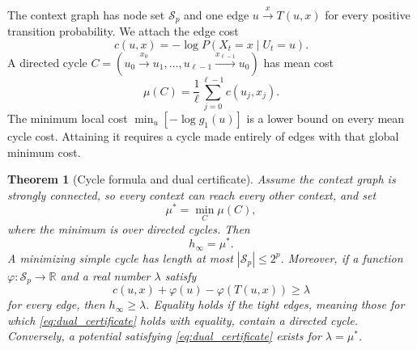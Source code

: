 \documentclass[11pt,a4paper]{article}
\newtheorem{theorem}{Theorem}
\begin{document}
The context graph has node set $\mathcal S_p$ and one edge
$u\xrightarrow{x}T(u,x)$ for every positive transition probability.
We attach the edge cost
\begin{equation}
\label{eq:edge_cost}
    c(u,x)=-\log P(X_t=x\mid U_t=u).
\end{equation}
A directed cycle
$C=(u_0\xrightarrow{x_0}u_1,\ldots,
 u_{\ell-1}\xrightarrow{x_{\ell-1}}u_0)$
has mean cost
\[
    \mu(C)=\frac1\ell\sum_{j=0}^{\ell-1}c(u_j,x_j).
\]
The minimum local cost $\min_u[-\log g_1(u)]$ is a lower bound on
every mean cycle cost.  Attaining it requires a cycle made entirely of
edges with that global minimum cost.

\begin{theorem}[Cycle formula and dual certificate]
\label{thm:cycle_and_dual}
Assume the context graph is strongly connected, so every context can
reach every other context, and set
\[
    \mu^*=\min_C\mu(C),
\]
where the minimum is over directed cycles.  Then
\[
    h_\infty=\mu^*.
\]
A minimizing simple cycle has length at most $|\mathcal S_p|\le2^p$.
Moreover, if a function $\varphi:\mathcal S_p\to\mathbb R$ and a
real number $\lambda$ satisfy
\begin{equation}
\label{eq:dual_certificate}
    c(u,x)+\varphi(u)-\varphi(T(u,x))\ge\lambda
\end{equation}
for every edge, then $h_\infty\ge\lambda$.  Equality holds if the tight
edges, meaning those for which \eqref{eq:dual_certificate} holds with
equality, contain a directed cycle.  Conversely, a potential satisfying
\eqref{eq:dual_certificate} exists for $\lambda=\mu^*$.
\end{theorem}
\end{document}
